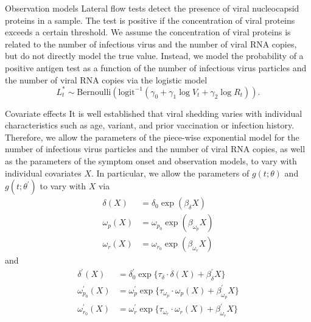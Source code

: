 \documentclass[9pt, aspectratio=169]{beamer}
\begin{document}
\begin{frame}{Observation models}
Lateral flow tests detect the presence of viral nucleocapsid proteins in a sample. The test is positive if the concentration of viral proteins exceeds a certain threshold. We assume the concentration of viral proteins is related to the number of infectious virus and the number of viral RNA copies, but do not directly model the true value. Instead, we model the probability of a positive antigen test as a function of the number of infectious virus particles and the number of viral RNA copies via the logistic model
\begin{equation*}
    L_t^* \sim \text{Bernoulli}(\text{logit}^{-1}(\gamma_0 + \gamma_1 \log V_t + \gamma_2 \log R_t)).
\end{equation*}
\end{frame}

\begin{frame}{Covariate effects}
    It is well established that viral shedding varies with individual characteristics such as age, variant, and prior vaccination or infection history. Therefore, we allow the parameters of the piece-wise exponential model for the number of infectious virus particles and the number of viral RNA copies, as well as the parameters of the symptom onset and observation models, to vary with individual covariates $X$. In particular, we allow the parameters of $g(t; \theta)$ and $g(t; \theta^\prime)$ to vary with $X$ via
\begin{align*}
    \delta(X) &= \delta_0 \exp(\beta_\delta X) \\
    \omega_{p}(X) &= \omega_{p_0} \exp(\beta_{\omega_p} X) \\
    \omega_{r}(X) &= \omega_{r_0} \exp(\beta_{\omega_r} X)
\end{align*}
and 
\begin{align*}
    \delta^\prime(X) &= \delta^\prime_0 \exp\{\tau_{\delta} \cdot \delta(X) + \beta^\prime_\delta X\} \\
    \omega^\prime_{p_0}(X) &= \omega^\prime_{p} \exp\{\tau_{\omega_{p}} \cdot \omega_{p}(X) + \beta^\prime_{\omega_p} X\} \\
    \omega^\prime_{r_0}(X) &= \omega^\prime_{r} \exp\{\tau_{\omega_{r}} \cdot \omega_{r}(X) + \beta^\prime_{\omega_r} X\}
\end{align*}
\end{frame}
\end{document}
